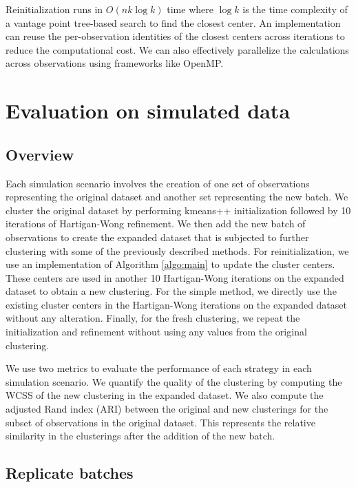 \documentclass{article}
\begin{document}
Reinitialization runs in $O(nk\log k)$ time where $\log k$ is the time complexity of a vantage point tree-based search \cite{yianilos1993data} to find the closest center.
An implementation can reuse the per-observation identities of the closest centers across iterations to reduce the computational cost.
We can also effectively parallelize the calculations across observations using frameworks like OpenMP.

\section{Evaluation on simulated data}

\subsection{Overview}

Each simulation scenario involves the creation of one set of observations representing the original dataset and another set representing the new batch.
We cluster the original dataset by performing kmeans++ initialization \cite{vassilvitskii2006kmeanspp} followed by 10 iterations of Hartigan-Wong refinement.
We then add the new batch of observations to create the expanded dataset that is subjected to further clustering with some of the previously described methods.
For reinitialization, we use an implementation of Algorithm \ref{algo:main} to update the cluster centers.
These centers are used in another 10 Hartigan-Wong iterations on the expanded dataset to obtain a new clustering.
For the simple method, we directly use the existing cluster centers in the Hartigan-Wong iterations on the expanded dataset without any alteration.
Finally, for the fresh clustering, we repeat the initialization and refinement without using any values from the original clustering.

We use two metrics to evaluate the performance of each strategy in each simulation scenario.
We quantify the quality of the clustering by computing the WCSS of the new clustering in the expanded dataset.
We also compute the adjusted Rand index (ARI) between the original and new clusterings for the subset of observations in the original dataset.
This represents the relative similarity in the clusterings after the addition of the new batch.

\subsection{Replicate batches}
\label{sec:repbatch}
\end{document}
